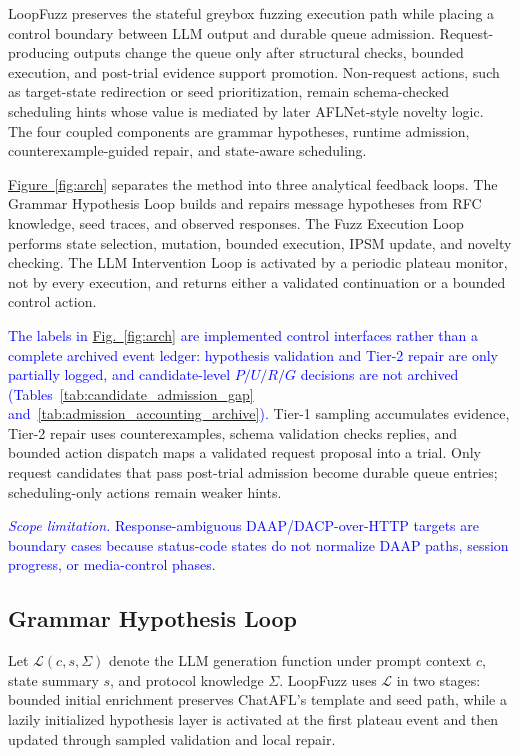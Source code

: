 \documentclass[final,5p,times,number]{elsarticle}
\newcommand{\figref}[1]{\hyperref[#1]{Fig.~\ref*{#1}}}
\newcommand{\figureref}[1]{\hyperref[#1]{Figure~\ref*{#1}}}
\begin{document}
LoopFuzz preserves the stateful greybox fuzzing execution path while placing a control boundary between LLM output and durable queue admission. Request-producing outputs change the queue only after structural checks, bounded execution, and post-trial evidence support promotion. Non-request actions, such as target-state redirection or seed prioritization, remain schema-checked scheduling hints whose value is mediated by later AFLNet-style novelty logic. The four coupled components are grammar hypotheses, runtime admission, counterexample-guided repair, and state-aware scheduling.

\figureref{fig:arch} separates the method into three analytical feedback loops. The Grammar Hypothesis Loop builds and repairs message hypotheses from RFC knowledge, seed traces, and observed responses. The Fuzz Execution Loop performs state selection, mutation, bounded execution, IPSM update, and novelty checking. The LLM Intervention Loop is activated by a periodic plateau monitor, not by every execution, and returns either a validated continuation or a bounded control action.

\textcolor{blue}{The labels in \figref{fig:arch} are implemented control interfaces rather than a complete archived event ledger: hypothesis validation and Tier-2 repair are only partially logged, and candidate-level $P/U/R/G$ decisions are not archived (Tables~\ref{tab:candidate_admission_gap} and~\ref{tab:admission_accounting_archive}).} Tier-1 sampling accumulates evidence, Tier-2 repair uses counterexamples, schema validation checks replies, and bounded action dispatch maps a validated request proposal into a trial. Only request candidates that pass post-trial admission become durable queue entries; scheduling-only actions remain weaker hints.

\textcolor{blue}{\emph{Scope limitation.} Response-ambiguous DAAP/DACP-over-HTTP targets are boundary cases because status-code states do not normalize DAAP paths, session progress, or media-control phases.}

\subsection{Grammar Hypothesis Loop}
Let $\mathcal{L}(c, s, \Sigma)$ denote the LLM generation function under prompt context $c$, state summary $s$, and protocol knowledge $\Sigma$. LoopFuzz uses $\mathcal{L}$ in two stages: bounded initial enrichment preserves ChatAFL's template and seed path, while a lazily initialized hypothesis layer is activated at the first plateau event and then updated through sampled validation and local repair.
\end{document}
